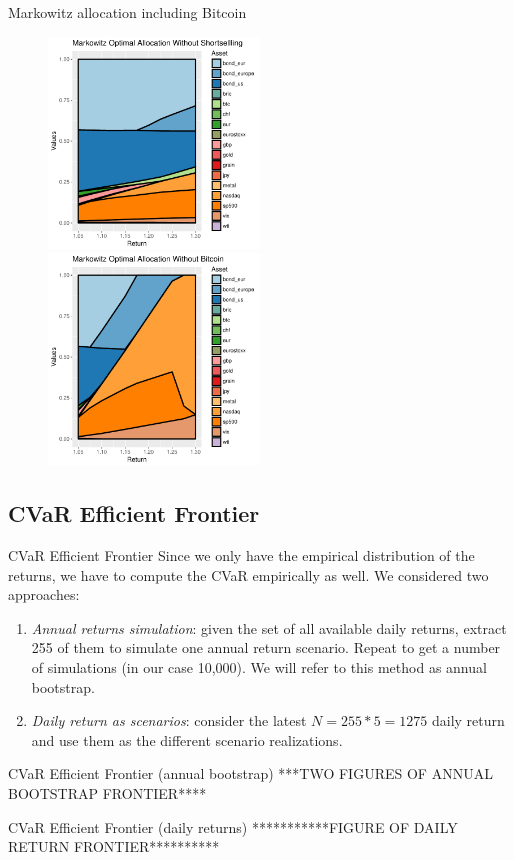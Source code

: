 \documentclass{beamer}
\begin{document}
\begin{frame}{Markowitz allocation including Bitcoin}
\begin{figure}
	\includegraphics[width=0.5\textwidth]{allocation_sample_btc_percentage}
	\includegraphics[width=0.5\textwidth]{allocation_sample_nobtc_percentage}
	\caption{}
\end{figure}
\end{frame}

\subsection{CVaR Efficient Frontier}
\begin{frame}{CVaR Efficient Frontier}
Since we only have the empirical distribution of the returns, we have to compute the CVaR empirically as well. We considered two approaches: 

\begin{enumerate}
	\item \textit{Annual returns simulation}: given the set of all available daily returns, extract 255 of them to simulate one annual return scenario. Repeat to get a number of simulations (in our case 10,000).
	We will refer to this method as annual bootstrap.
	\item \textit{Daily return as scenarios}: consider the latest $N = 255 * 5 = 1275$  daily return and use them as the different scenario realizations.
\end{enumerate}
\end{frame}

\begin{frame}{CVaR Efficient Frontier (annual bootstrap)}
***TWO FIGURES OF ANNUAL BOOTSTRAP FRONTIER****
\end{frame}

\begin{frame}{CVaR Efficient Frontier (daily returns)}
***********FIGURE OF DAILY RETURN FRONTIER**********
\end{frame}
\end{document}
